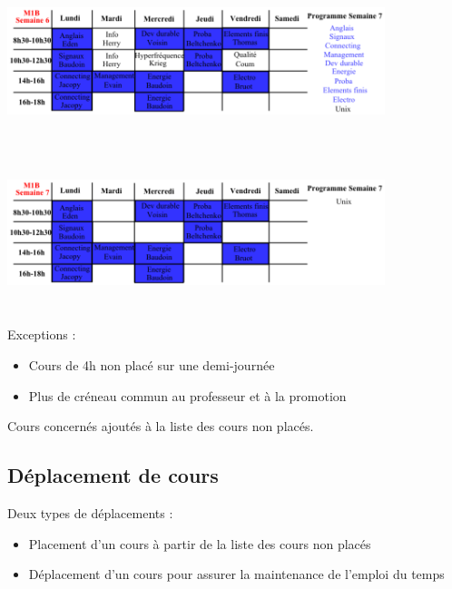 \documentclass{beamer}
\begin{document}
\begin{frame}
\begin{center}
\includegraphics [width=110mm, height=45mm]{Dessin4.png}
\end{center}
\end{frame}

\begin{frame}
\begin{center}
\includegraphics [width=110mm, height=45mm]{Dessin5.png}
\end{center}
\end{frame}

\begin{frame}
Exceptions :
\begin{itemize}
\item Cours de 4h non placé sur une demi-journée
\item Plus de créneau commun au professeur et à la promotion\\
\end{itemize}
Cours concernés ajoutés à la liste des cours non placés.
\end{frame}

\subsection{Déplacement de cours}
\begin{frame}
Deux types de déplacements :
\begin{itemize}
\item Placement d'un cours à partir de la liste des cours non placés
\item Déplacement d'un cours pour assurer la maintenance de l'emploi du temps
\end{itemize}
\end{frame}
\end{document}
